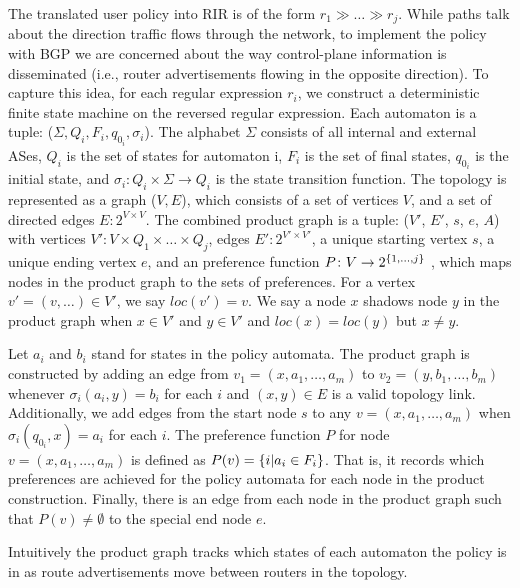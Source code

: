 
The translated user policy into RIR is of the form $r_1 \gg \dots \gg r_j$. While paths talk about the direction traffic flows through the network, to implement the policy with BGP we are concerned about the way control-plane information is disseminated (i.e., router advertisements flowing in the opposite direction). To capture this idea, for each regular expression $r_i$, we construct a deterministic finite state machine on the reversed regular expression. Each automaton is a tuple: ($\Sigma, Q_i, F_i, q_{0_i}, \sigma_i$). The alphabet $\Sigma$ consists of all internal and external ASes, $Q_i$ is the set of states for automaton i, $F_i$ is the set of final states, $q_{0_i}$ is the initial state, and $\sigma_i \colon Q_i \times \Sigma \rightarrow Q_i$ is the state transition function.
%
The topology is represented as a graph ($V, E$), which consists of a set of vertices $V$, and a set of directed edges $E \colon 2^{V \times V}$.
%
The combined product graph is a tuple: ($V'$, $E'$, $s$, $e$, $A$) with 
vertices $V' \colon V \times Q_1 \times \dots \times Q_j$, 
edges $E' \colon 2^{V' \times V'}$, 
a unique starting vertex $s$, 
a unique ending vertex $e$,
and an preference function $P \colon V \rightarrow 2^{\{ 1, \dots, j \} }$ , which maps nodes in the product graph to the sets of preferences. 
For a vertex $v' = (v, \dots) \in V'$, we say $loc(v') = v$. We say a node $x$ shadows node $y$ in the product graph when $x \in V'$ and $y \in V'$ and $loc(x) = loc(y)$ but $x \neq y$.

Let $a_i$ and $b_i$ stand for states in the policy automata.
The product graph is constructed by adding an edge from $v_1 = (x, a_1, \dots, a_m)$ to $v_2 = (y, b_1, \dots, b_m)$ whenever $\sigma_i(a_i, y) = b_i$ for each $i$ and $(x,y) \in E$ is a valid topology link. 
Additionally, we add edges from the start node $s$ to any $v = (x, a_1, \dots, a_m)$ when $\sigma_i(q_{0_i}, x) = a_i$ for each $i$.
The preference function $P$ for node $v = (x, a_1, \dots, a_m)$ is defined as $P(v) = \{ i \vert a_i \in F_i \}  $. That is, it records which preferences are achieved for the policy automata for each node in the product construction.
Finally, there is an edge from each node in the product graph such that $P(v) \neq \emptyset$ to the special end node $e$.



Intuitively the product graph tracks which states of each automaton the policy is in as route advertisements move between routers in the topology. 


